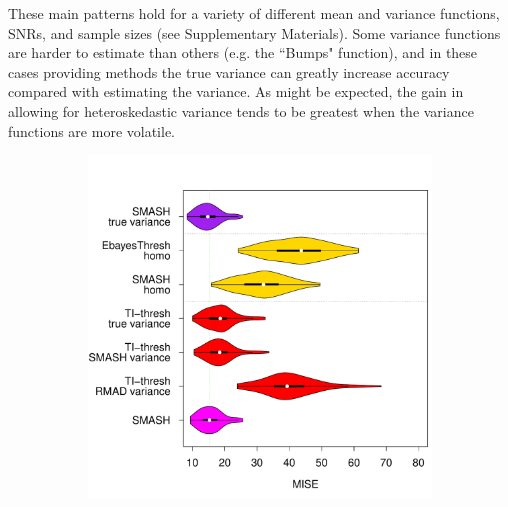 \documentclass[12pt]{article}
\begin{document}
These main patterns hold for a variety of different mean and variance functions, SNRs, and sample sizes (see Supplementary Materials). Some variance functions are harder to estimate than others (e.g. the ``Bumps" function), and in these cases providing methods the true variance can greatly increase
accuracy compared with estimating the variance. 
As might be expected, the gain in allowing for heteroskedastic variance tends to be greatest when the variance functions are more
volatile.

\begin{figure}
\centering
    \begin{subfigure}[b]{0.65\textwidth}
        \centering
        \includegraphics[width=\textwidth]{violin_gaus_hetero_1.pdf}
        \caption{}
        \label{fig:gaus_hetero_1}
    \end{subfigure}
		\hfill
    \begin{subfigure}[b]{0.3\textwidth}
        \centering

\end{subfigure}
\end{figure}
\end{document}
